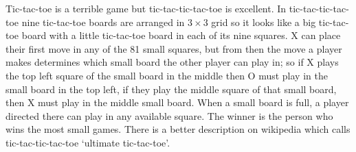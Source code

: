\documentclass[11pt,a4paper]{scrartcl}
\begin{document}
Tic-tac-toe is a terrible game but tic-tac-tic-tac-toe is
excellent. In tic-tac-tic-tac-toe nine tic-tac-toe boards are arranged
in $3\times 3$ grid so it looks like a big tic-tac-toe board with a
little tic-tac-toe board in each of its nine squares. X can place
their first move in any of the 81 small squares, but from then the
move a player makes determines which small board the other player can
play in; so if X plays the top left square of the small board in the
middle then O must play in the small board in the top left, if they
play the middle square of that small board, then X must play in the
middle small board. When a small board is full, a player directed
there can play in any available square. The winner is the person who
wins the most small games. There is a better description on wikipedia
which calls tic-tac-tic-tac-toe `ultimate tic-tac-toe'.
\end{document}
